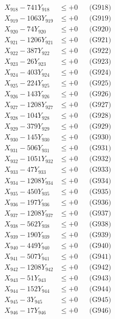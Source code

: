 \documentclass[a4paper,10pt]{article}
\begin{document}
{\begin{align}
X_{918} - 741Y_{918} &\leq +0 && \text{(G918)} \\
X_{919} - 1063Y_{919} &\leq +0 && \text{(G919)} \\
X_{920} - 74Y_{920} &\leq +0 && \text{(G920)} \\
\allowbreak
X_{921} - 1206Y_{921} &\leq +0 && \text{(G921)} \\
X_{922} - 387Y_{922} &\leq +0 && \text{(G922)} \\
X_{923} - 26Y_{923} &\leq +0 && \text{(G923)} \\
X_{924} - 403Y_{924} &\leq +0 && \text{(G924)} \\
X_{925} - 224Y_{925} &\leq +0 && \text{(G925)} \\
X_{926} - 143Y_{926} &\leq +0 && \text{(G926)} \\
X_{927} - 1208Y_{927} &\leq +0 && \text{(G927)} \\
X_{928} - 104Y_{928} &\leq +0 && \text{(G928)} \\
X_{929} - 379Y_{929} &\leq +0 && \text{(G929)} \\
X_{930} - 145Y_{930} &\leq +0 && \text{(G930)} \\
\allowbreak
X_{931} - 506Y_{931} &\leq +0 && \text{(G931)} \\
X_{932} - 1051Y_{932} &\leq +0 && \text{(G932)} \\
X_{933} - 47Y_{933} &\leq +0 && \text{(G933)} \\
X_{934} - 1208Y_{934} &\leq +0 && \text{(G934)} \\
X_{935} - 450Y_{935} &\leq +0 && \text{(G935)} \\
X_{936} - 197Y_{936} &\leq +0 && \text{(G936)} \\
X_{937} - 1208Y_{937} &\leq +0 && \text{(G937)} \\
X_{938} - 562Y_{938} &\leq +0 && \text{(G938)} \\
X_{939} - 190Y_{939} &\leq +0 && \text{(G939)} \\
X_{940} - 449Y_{940} &\leq +0 && \text{(G940)} \\
\allowbreak
X_{941} - 507Y_{941} &\leq +0 && \text{(G941)} \\
X_{942} - 1208Y_{942} &\leq +0 && \text{(G942)} \\
X_{943} - 51Y_{943} &\leq +0 && \text{(G943)} \\
X_{944} - 152Y_{944} &\leq +0 && \text{(G944)} \\
X_{945} - 3Y_{945} &\leq +0 && \text{(G945)} \\
X_{946} - 17Y_{946} &\leq +0 && \text{(G946)} \\

\end{align}}
\end{document}
